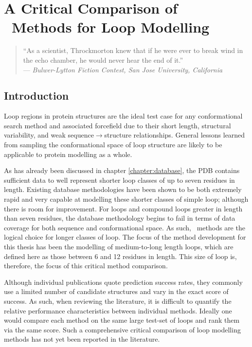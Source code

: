 \chapter{A Critical Comparison of \AbInitio\ Methods for Loop Modelling}
\label{chapter:methods}

\begin{quote}
``As a scientist, Throckmorton knew that if he were ever to break wind in the echo chamber, he would never hear the end of it.''\\
--- \textit{Bulwer-Lytton Fiction Contest, San Jose University, California}
\end{quote}

\section{Introduction}

Loop regions in protein structures are the ideal test case for any conformational
search method and associated forcefield due to their short length, structural variability, and weak sequence$\to$structure relationships. General lessons learned from sampling
the conformational space of loop structure are likely to be applicable to
protein modelling as a whole.

As has already been discussed in chapter \ref{chapter:database}, the PDB contains sufficient data to well represent shorter loop classes of up to seven residues in length\cite{METHOD:Fid94}.
Existing database methodologies have been shown to be both extremely rapid and very capable at modelling these shorter classes of simple loop; although there is room for improvement. For loops and compound loops greater in length than seven residues, the database methodology begins to fail in terms of data coverage for  both sequence and
conformational space. As such, \abinitio\ methods are the logical choice for longer classes of loop.
The focus of the method development for this thesis has been the modelling of medium-to-long length loops, which are defined here as those between 6 and 12 residues in length. This size of loop is, therefore, the focus of this critical method comparison.

Although individual publications quote prediction success rates, they commonly
use a limited
number of candidate structures and vary in the exact score of success. As
such, when reviewing the literature, it is difficult to quantify the relative
performance characteristics between individual methods.  Ideally one would
compare each method on the same large test-set of loops and rank them via the same
score. Such a comprehensive critical comparison of loop modelling methods has not yet been reported in the literature. 




